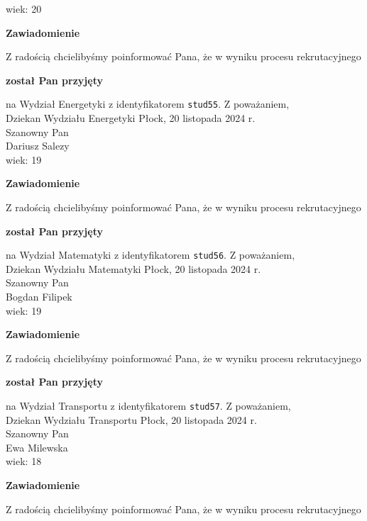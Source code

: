 \documentclass[12pt,a4paper]{article}
\begin{document}
wiek: 20
\bigskip
\begin{center}
 	{\Large\textbf{Zawiadomienie}}
\end{center}
\bigskip
Z radością chcielibyśmy poinformować Pana, że w wyniku procesu rekrutacyjnego 
\begin{center}
\textsf{\textbf{został Pan przyjęty}} 
\end{center}
na Wydział Energetyki z identyfikatorem \verb|stud55|. 
\vspace{2cm}
\noindent
Z poważaniem,\\
Dziekan
Wydziału Energetyki
\newpage
\hfill Płock, 20 listopada 2024 r.\\
\noindent 
Szanowny Pan \\
Dariusz Salezy \\
wiek: 19
\bigskip
\begin{center}
 	{\Large\textbf{Zawiadomienie}}
\end{center}
\bigskip
Z radością chcielibyśmy poinformować Pana, że w wyniku procesu rekrutacyjnego 
\begin{center}
\textsf{\textbf{został Pan przyjęty}} 
\end{center}
na Wydział Matematyki z identyfikatorem \verb|stud56|. 
\vspace{2cm}
\noindent
Z poważaniem,\\
Dziekan
Wydziału Matematyki
\newpage
\hfill Płock, 20 listopada 2024 r.\\
\noindent 
Szanowny Pan \\
Bogdan Filipek \\
wiek: 19
\bigskip
\begin{center}
 	{\Large\textbf{Zawiadomienie}}
\end{center}
\bigskip
Z radością chcielibyśmy poinformować Pana, że w wyniku procesu rekrutacyjnego 
\begin{center}
\textsf{\textbf{został Pan przyjęty}} 
\end{center}
na Wydział Transportu z identyfikatorem \verb|stud57|. 
\vspace{2cm}
\noindent
Z poważaniem,\\
Dziekan
Wydziału Transportu
\newpage
\hfill Płock, 20 listopada 2024 r.\\
\noindent 
Szanowny Pan \\
Ewa Milewska \\
wiek: 18
\bigskip
\begin{center}
 	{\Large\textbf{Zawiadomienie}}
\end{center}
\bigskip
Z radością chcielibyśmy poinformować Pana, że w wyniku procesu rekrutacyjnego 
\end{document}
